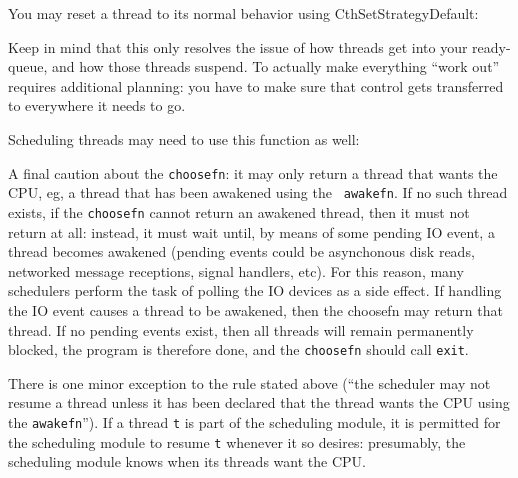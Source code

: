 You may reset a thread to its normal behavior using CthSetStrategyDefault:


Keep in mind that this only resolves the issue of how threads get into
your ready-queue, and how those threads suspend.  To actually make
everything ``work out'' requires additional planning: you have to make
sure that control gets transferred to everywhere it needs to go.

Scheduling threads may need to use this function as well:


A final caution about the {\tt choosefn}: it may only return a thread
that wants the CPU, eg, a thread that has been awakened using the {\tt
awakefn}.  If no such thread exists, if the {\tt choosefn} cannot
return an awakened thread, then it must not return at all: instead, it
must wait until, by means of some pending IO event, a thread becomes
awakened (pending events could be asynchonous disk reads, networked
message receptions, signal handlers, etc).  For this reason, many
schedulers perform the task of polling the IO devices as a side
effect.  If handling the IO event causes a thread to be awakened, then
the choosefn may return that thread.  If no pending events exist, then
all threads will remain permanently blocked, the program is therefore
done, and the {\tt choosefn} should call {\tt exit}.

There is one minor exception to the rule stated above (``the scheduler
may not resume a thread unless it has been declared that the thread
wants the CPU using the {\tt awakefn}'').  If a thread {\tt t} is part
of the scheduling module, it is permitted for the scheduling module to
resume {\tt t} whenever it so desires: presumably, the scheduling
module knows when its threads want the CPU.

